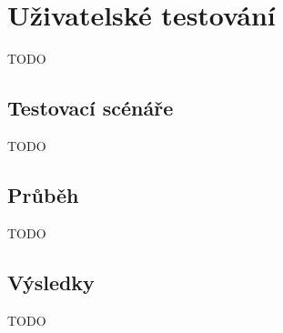 \chapter{Uživatelské testování}
TODO

\section{Testovací scénáře}
TODO

\section{Průběh}
TODO

\section{Výsledky}
TODO
